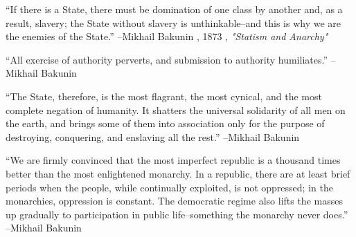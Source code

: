 \documentclass{article}%
\begin{document}
\linebreak%
\vspace{1mm}%
\begin{minipage}{\textwidth}%
\flushleft%
“If there is a State, there must be domination of one class by another and, as a result, slavery; the State without slavery is unthinkable–and this is why we are the enemies of the State.”%
\linebreak%
\vspace{1mm}%
–Mikhail Bakunin%
, 1873%
, \textit{"Statism and Anarchy"}%
\linebreak%
\vspace{1mm}%
\end{minipage}%
\linebreak%
\vspace{1mm}%
\begin{minipage}{\textwidth}%
\flushleft%
“All exercise of authority perverts, and submission to authority humiliates.”%
\linebreak%
\vspace{1mm}%
–Mikhail Bakunin%
\linebreak%
\vspace{1mm}%
\end{minipage}%
\linebreak%
\vspace{1mm}%
\begin{minipage}{\textwidth}%
\flushleft%
“The State, therefore, is the most flagrant, the most cynical, and the most complete negation of humanity. It shatters the universal solidarity of all men on the earth, and brings some of them into association only for the purpose of destroying, conquering, and enslaving all the rest.”%
\linebreak%
\vspace{1mm}%
–Mikhail Bakunin%
\linebreak%
\vspace{1mm}%
\end{minipage}%
\linebreak%
\vspace{1mm}%
\begin{minipage}{\textwidth}%
\flushleft%
“We are firmly convinced that the most imperfect republic is a thousand times better than the most enlightened monarchy. In a republic, there are at least brief periods when the people, while continually exploited, is not oppressed; in the monarchies, oppression is constant. The democratic regime also lifts the masses up gradually to participation in public life–something the monarchy never does.”%
\linebreak%
\vspace{1mm}%
–Mikhail Bakunin%
\linebreak%
\vspace{1mm}%
\end{minipage}%
\end{document}
